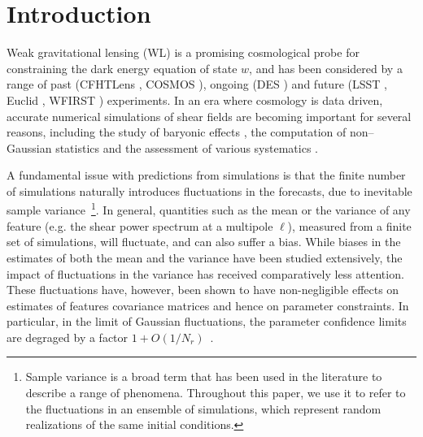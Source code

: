 \documentclass[reprint,aps,prd,superscriptaddress,showkeys,showpacs]{revtex4-1}
\begin{document}

\maketitle



\section{Introduction}
%
Weak gravitational lensing (WL) is a promising cosmological probe for
constraining the dark energy equation of state $w$, and has been
considered by a range of past (CFHTLens \citep{cfht1,cfht2}, COSMOS
\citep{cosmos}), ongoing (DES \citep{DES}) and future (LSST
\citep{LSST}, Euclid \citep{Euclid}, WFIRST \citep{WFIRST})
experiments. In an era where cosmology is data driven, accurate
numerical simulations of shear fields are becoming important for
several reasons, including the study of baryonic effects
\citep{BaryonXiuyuan,BaryonSemboloni,BaryonsWhite,BaryonsKnox,BaryonsZentner1,BaryonsZentner2},
the computation of non--Gaussian statistics
\citep{PeaksJan,MinkJan,MinkPetri,NG-Marian,NG-Jain1,NG-Jain2,NG-Jain3,NG-Refregier,NG-Dietrich}
and the assessment of various systematics
\citep{MinkShirasaki,Sys-Bard,Sys-Chang,Sys-Huterer}.

A fundamental issue with predictions from simulations is that the
finite number of simulations naturally introduces fluctuations in the
forecasts, due to inevitable sample variance~\footnote{Sample variance
  is a broad term that has been used in the literature to describe a
  range of phenomena.  Throughout this paper, we use it to refer to
  the fluctuations in an ensemble of simulations, which represent
  random realizations of the same initial conditions.}.  In general,
quantities such as the mean or the variance of any feature (e.g. the
shear power spectrum at a multipole $\ell$), measured from a finite
set of simulations, will fluctuate, and can also suffer a bias.  While
biases in the estimates of both the mean and the variance have been
studied extensively, the impact of fluctuations in the variance has
received comparatively less attention.  These fluctuations have,
however, been shown to have non-negligible effects on estimates of
features covariance matrices and hence on parameter constraints. In
particular, in the limit of Gaussian fluctuations, the parameter
confidence limits are degraged by a factor
$1+O(1/N_r)$~\citep{DodelsonSchneider13,Taylor12}.
\end{document}
